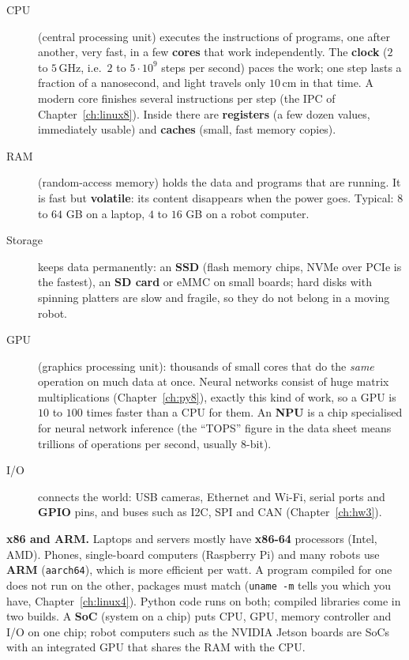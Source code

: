 \begin{description}
  \item[CPU] (central processing unit) executes the instructions of programs, one after another, very fast, in a few \textbf{cores} that work independently. The \textbf{clock} ($2$ to $5$\,GHz, i.e.\ $2$ to $5\cdot10^9$ steps per second) paces the work; one step lasts a fraction of a nanosecond, and light travels only $10$\,cm in that time. A modern core finishes several instructions per step (the IPC of Chapter~\ref{ch:linux8}). Inside there are \textbf{registers} (a few dozen values, immediately usable) and \textbf{caches} (small, fast memory copies).
  \item[RAM] (random-access memory) holds the data and programs that are running. It is fast but \textbf{volatile}: its content disappears when the power goes. Typical: $8$ to $64$ GB on a laptop, $4$ to $16$ GB on a robot computer.
  \item[Storage] keeps data permanently: an \textbf{SSD} (flash memory chips, NVMe over PCIe is the fastest), an \textbf{SD card} or eMMC on small boards; hard disks with spinning platters are slow and fragile, so they do not belong in a moving robot.
  \item[GPU] (graphics processing unit): thousands of small cores that do the \emph{same} operation on much data at once. Neural networks consist of huge matrix multiplications (Chapter~\ref{ch:py8}), exactly this kind of work, so a GPU is $10$ to $100$ times faster than a CPU for them. An \textbf{NPU} is a chip specialised for neural network inference (the ``TOPS'' figure in the data sheet means trillions of operations per second, usually 8-bit).
  \item[I/O] connects the world: USB cameras, Ethernet and Wi-Fi, serial ports and \textbf{GPIO} pins, and buses such as I2C, SPI and CAN (Chapter~\ref{ch:hw3}).
\end{description}
\textbf{x86 and ARM.} Laptops and servers mostly have \textbf{x86-64} processors (Intel, AMD). Phones, single-board computers (Raspberry Pi) and many robots use \textbf{ARM} (\texttt{aarch64}), which is more efficient per watt. A program compiled for one does not run on the other, packages must match (\verb!uname -m! tells you which you have, Chapter~\ref{ch:linux4}). Python code runs on both; compiled libraries come in two builds. A \textbf{SoC} (system on a chip) puts CPU, GPU, memory controller and I/O on one chip; robot computers such as the NVIDIA Jetson boards are SoCs with an integrated GPU that shares the RAM with the CPU.

